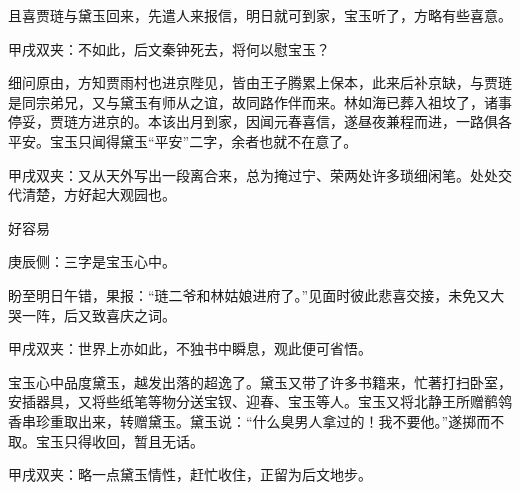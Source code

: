 \begin{parag}
    且喜贾琏与黛玉回来，先遣人来报信，明日就可到家，宝玉听了，方略有些喜意。\begin{note}甲戌双夹：不如此，后文秦钟死去，将何以慰宝玉？\end{note}细问原由，方知贾雨村也进京陛见，皆由王子腾累上保本，此来后补京缺，与贾琏是同宗弟兄，又与黛玉有师从之谊，故同路作伴而来。林如海已葬入祖坟了，诸事停妥，贾琏方进京的。本该出月到家，因闻元春喜信，遂昼夜兼程而进，一路俱各平安。宝玉只闻得黛玉“平安”二字，余者也就不在意了。\begin{note}甲戌双夹：又从天外写出一段离合来，总为掩过宁、荣两处许多琐细闲笔。处处交代清楚，方好起大观园也。\end{note}
\end{parag}


\begin{parag}
    好容易\begin{note}庚辰侧：三字是宝玉心中。\end{note}盼至明日午错，果报：“琏二爷和林姑娘进府了。”见面时彼此悲喜交接，未免又大哭一阵，后又致喜庆之词。\begin{note}甲戌双夹：世界上亦如此，不独书中瞬息，观此便可省悟。\end{note}宝玉心中品度黛玉，越发出落的超逸了。黛玉又带了许多书籍来，忙著打扫卧室，安插器具，又将些纸笔等物分送宝钗、迎春、宝玉等人。宝玉又将北静王所赠鹡鸰香串珍重取出来，转赠黛玉。黛玉说：“什么臭男人拿过的！我不要他。”遂掷而不取。宝玉只得收回，暂且无话。\begin{note}甲戌双夹：略一点黛玉情性，赶忙收住，正留为后文地步。\end{note}
\end{parag}


